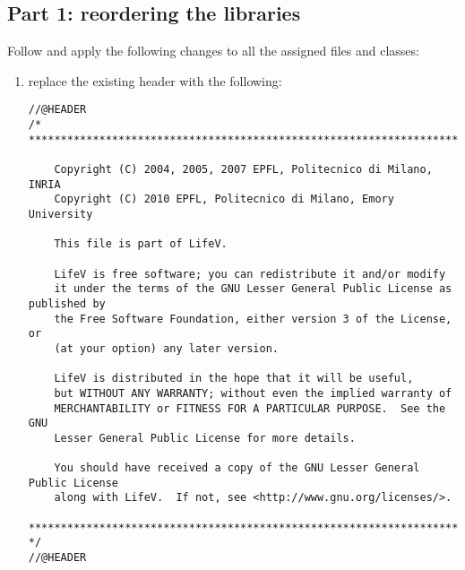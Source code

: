 \documentclass[10p]{article}
\theoremstyle{definition}
\begin{document}
\subsection*{Part 1: reordering the libraries}
Follow and apply the following changes to all the assigned files and classes:
\begin{enumerate}
  \item replace the existing header with the following:
\begin{lstlisting}
//@HEADER
/*
*******************************************************************************

    Copyright (C) 2004, 2005, 2007 EPFL, Politecnico di Milano, INRIA
    Copyright (C) 2010 EPFL, Politecnico di Milano, Emory University

    This file is part of LifeV.

    LifeV is free software; you can redistribute it and/or modify
    it under the terms of the GNU Lesser General Public License as published by
    the Free Software Foundation, either version 3 of the License, or
    (at your option) any later version.

    LifeV is distributed in the hope that it will be useful,
    but WITHOUT ANY WARRANTY; without even the implied warranty of
    MERCHANTABILITY or FITNESS FOR A PARTICULAR PURPOSE.  See the GNU
    Lesser General Public License for more details.

    You should have received a copy of the GNU Lesser General Public License
    along with LifeV.  If not, see <http://www.gnu.org/licenses/>.

*******************************************************************************
*/
//@HEADER


\end{lstlisting}
\end{enumerate}
\end{document}
